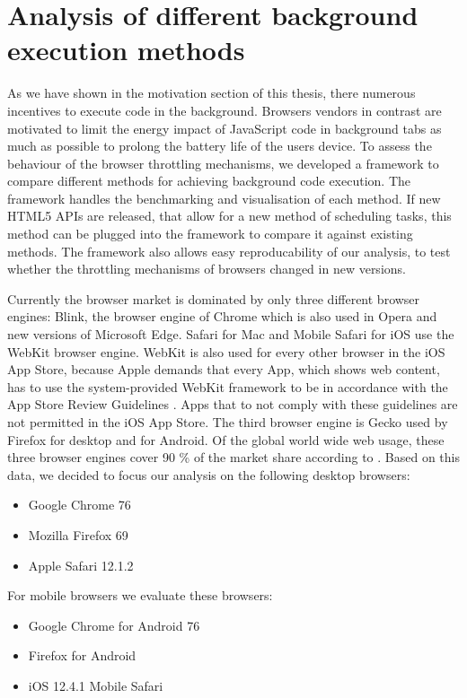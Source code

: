 \documentclass[
	ngerman,
	ruledheaders=section,%
	class=report,%
	thesis={type=bachelor},%
	accentcolor=9c,%
	custommargins=true,%
	marginpar=false,%
	parskip=half-,%
	fontsize=11pt,%
]{tudapub}
\begin{document}
  
  \newpage
  \chapter{Analysis of different background execution methods}

  As we have shown in the motivation section of this thesis, there numerous incentives to execute code in the background. Browsers vendors in contrast are motivated to limit the energy impact of JavaScript code in background tabs as much as possible to prolong the battery life of the users device. To assess the behaviour of the browser throttling mechanisms, we developed a framework to compare different methods for achieving background code execution. The framework handles the benchmarking and visualisation of each method. If new HTML5 APIs are released, that allow for a new method of scheduling tasks, this method can be plugged into the framework to compare it against existing methods. The framework also allows easy reproducability of our analysis, to test whether the throttling mechanisms of browsers changed in new versions.

  Currently the browser market is dominated by only three different browser engines: Blink, the browser engine of Chrome which is also used in Opera and new versions of Microsoft Edge. Safari for Mac and Mobile Safari for iOS use the WebKit browser engine. WebKit is also used for every other browser in the iOS App Store, because Apple demands that every App, which shows web content, has to use the system-provided WebKit framework to be in accordance with the App Store Review Guidelines \cite{apple-app-review-guideline}. Apps that to not comply with these guidelines are not permitted in the iOS App Store. The third browser engine is Gecko used by Firefox for desktop and for Android. Of the global world wide web usage, these three browser engines cover 90 \% of the market share according to \cite{statcounter-global-browser-market-share}. Based on this data, we decided to focus our analysis on the following desktop browsers:

  \begin{itemize}
  \item Google Chrome 76
  \item Mozilla Firefox 69
  \item Apple Safari 12.1.2
  \end{itemize}

  For mobile browsers we evaluate these browsers:

  \begin{itemize}
  \item Google Chrome for Android 76
  \item Firefox for Android
  \item iOS 12.4.1 Mobile Safari
  \end{itemize}
\end{document}
